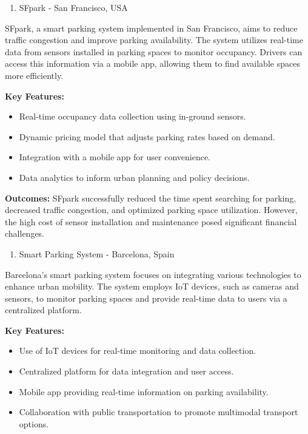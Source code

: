 \documentclass[oneside, 12pt, a4paper, draft]{book}
\begin{document}
\begin{enumerate}
\item SFpark - San Francisco, USA
\end{enumerate}

SFpark, a smart parking system implemented in San Francisco, aims to reduce traffic congestion and improve parking availability. The system utilizes real-time data from sensors installed in parking spaces to monitor occupancy. Drivers can access this information via a mobile app, allowing them to find available spaces more efficiently.

\textbf{Key Features:}
\begin{itemize}
\item Real-time occupancy data collection using in-ground sensors.
\item Dynamic pricing model that adjusts parking rates based on demand.
\item Integration with a mobile app for user convenience.
\item Data analytics to inform urban planning and policy decisions.
\end{itemize}

\textbf{Outcomes:}
SFpark successfully reduced the time spent searching for parking, decreased traffic congestion, and optimized parking space utilization. However, the high cost of sensor installation and maintenance posed significant financial challenges.

\begin{enumerate}
\item Smart Parking System - Barcelona, Spain
\end{enumerate}

Barcelona's smart parking system focuses on integrating various technologies to enhance urban mobility. The system employs IoT devices, such as cameras and sensors, to monitor parking spaces and provide real-time data to users via a centralized platform.

\textbf{Key Features:}
\begin{itemize}
\item Use of IoT devices for real-time monitoring and data collection.
\item Centralized platform for data integration and user access.
\item Mobile app providing real-time information on parking availability.
\item Collaboration with public transportation to promote multimodal transport options.
\end{itemize}
\end{document}
